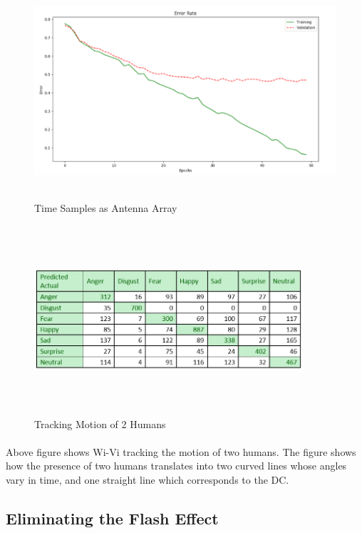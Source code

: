 \documentclass[a4paper,12pt,oneside]{article}
\begin{document}
\begin{figure}[H]
\centering
\includegraphics[height=8cm,width=13cm]{7.png}
\caption{Time Samples as Antenna Array}
\end{figure}


\begin{figure}[H]
\centering
\includegraphics[height=7cm,width=10cm]{8.png}
\caption{Tracking Motion of 2 Humans}
\end{figure}
\paragraph{}
Above figure shows Wi-Vi tracking the motion of two humans. The figure shows how the presence
of two humans translates into two curved lines whose angles vary in time, and one straight
line which corresponds to the DC.

\subsection{Eliminating the Flash Effect}
\end{document}
